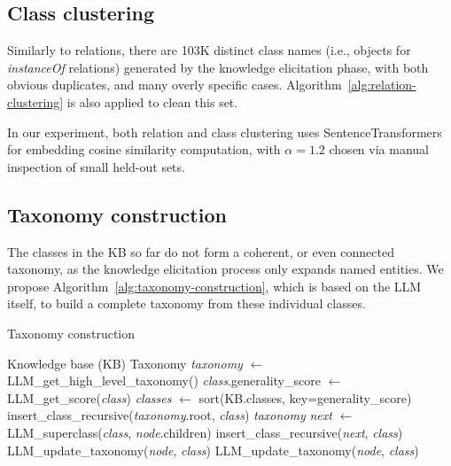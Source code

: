 \subsection{Class clustering}
Similarly to relations, there are 103K distinct class names
(i.e., objects for \textit{instanceOf} relations) 
generated by the knowledge elicitation phase, 
with both obvious duplicates, and many overly specific cases. 
Algorithm~\ref{alg:relation-clustering} is also applied to clean this set.

In our experiment, both relation and class clustering uses SentenceTransformers \cite{reimers-2019-sentence-bert} for embedding cosine similarity computation, with $\alpha = 1.2$ chosen via manual inspection of small held-out sets.

\subsection{Taxonomy construction}
The classes 
in the KB
so far 
do not form 
a 
coherent, or even 
connected taxonomy, 
as the knowledge elicitation process only expands named entities. 
We propose Algorithm~\ref{alg:taxonomy-construction}, which is based on the LLM itself, to build a complete taxonomy from these individual classes.

\begin{algorithm}[ht]
\small
\caption{Taxonomy construction}\label{alg:taxonomy-construction}
\begin{algorithmic}[1]
\Require Knowledge base (KB)
\Ensure Taxonomy
    \State \textit{taxonomy} $\gets$ LLM\_get\_high\_level\_taxonomy()
        \State \textit{class}.generality\_score $\gets$ LLM\_get\_score(\textit{class})
    \EndFor
    \State \textit{classes} $\gets$ sort(KB.classes, key=generality\_score)
        \State insert\_class\_recursive(\textit{taxonomy}.root, \textit{class})
    \EndFor
    \State \Return \textit{taxonomy}
\EndFunction
\Statex
{}
        \State \textit{next} $\gets$ LLM\_superclass(\textit{class}, \textit{node}.children)
            \State insert\_class\_recursive(\textit{next}, \textit{class})
        \Else
            \State LLM\_update\_taxonomy(\textit{node}, \textit{class})
        \EndIf
    \Else
        \State LLM\_update\_taxonomy(\textit{node}, \textit{class})
    \EndIf
\EndFunction
\end{algorithmic}
\end{algorithm}

